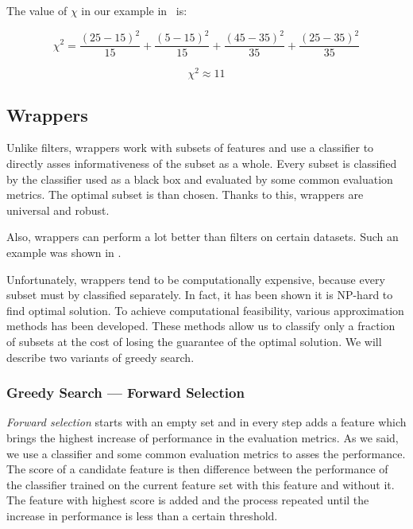 The value of $\chi$ in our example in 
~is:

\begin{equation}
\chi^2 = 
\frac{\left(25-15\right)^2}{15} +
\frac{\left(5-15\right)^2}{15} +
\frac{\left(45-35\right)^2}{35} +
\frac{\left(25-35\right)^2}{35}
\end{equation}

\begin{equation}
\chi^2 \approx 11
\end{equation}


\subsection{Wrappers}

Unlike filters, wrappers work with subsets of features
and use a classifier to directly asses informativeness of the subset as a whole.
Every subset is classified by the classifier used as a black box
and evaluated by some common evaluation metrics.
The optimal subset is than chosen.
Thanks to this, wrappers are universal and robust.

Also, wrappers can perform a lot better than filters on certain datasets.
Such an example was shown in .

Unfortunately, wrappers tend to be computationally expensive,
because every subset must by classified separately.
In fact, it has been shown it is NP-hard to find optimal solution.
To achieve computational feasibility, various approximation methods has been developed.
These methods allow us to classify only a fraction of subsets
at the cost of losing the guarantee of the optimal solution.
We will describe two variants of greedy search.


\subsubsection{Greedy Search --- Forward Selection}

{\it Forward selection} starts with an empty set and in every step adds a feature which brings the highest increase of performance in the evaluation metrics.
As we said, we use a classifier and some common evaluation metrics to asses the performance.
The score of a candidate feature is then difference between the performance of the classifier trained on the current feature set with this feature and without it.
The feature with highest score is added and the process repeated until the increase in performance is less than a certain threshold. 

